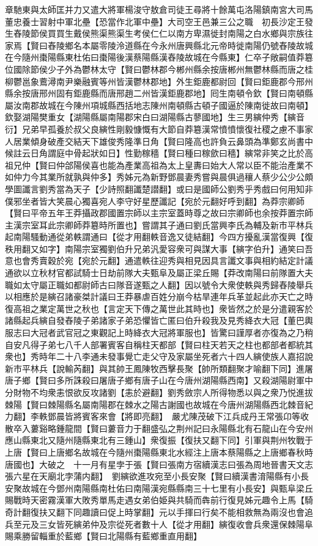 章馳東與太師匡并力又遣大將軍楊浚守敖倉司徒王尋將十餘萬屯洛陽鎮南宮大司馬董忠養士習射中軍北壘【恐當作北軍中壘】大司空王邑兼三公之職　初長沙定王發生舂陵節侯買買生戴侯熊渠熊渠生考侯仁仁以南方卑濕徙封南陽之白水鄉與宗族往家焉【賢曰舂陵鄉名本屬零陵泠道縣在今永州唐興縣北元帝時徙南陽仍號舂陵故城在今隨州棗陽縣東杜佑曰棗陽後漢蔡陽縣漢舂陵故城在今縣東】仁卒子敞嗣值莽簒位國除節侯少子外為鬱林太守【賢曰鬱林郡今郴州縣余按唐郴州無鬱林縣而唐之桂柳鬱邕象鷰潯南尹樂融賓等州皆漢鬱林郡地】外生鉅鹿都尉回【賢曰鉅鹿郡今邢州縣余按唐邢州固有鉅鹿縣而唐邢趙二州皆漢鉅鹿郡地】囘生南頓令欽【賢曰南頓縣屬汝南郡故城在今陳州項城縣西括地志陳州南頓縣古頓子國逼於陳南徙故曰南頓】欽娶湖陽樊重女【湖陽縣屬南陽郡宋白曰湖陽縣古蓼國地】生三男縯仲秀【縯音衍】兄弟早孤養於叔父良縯性剛毅慷慨有大節自莽簒漢常憤憤懷復社稷之慮不事家人居業傾身破產交結天下雄俊秀隆準日角【賢曰隆高也許負云鼻頭為準鄭玄尚書中候註云日角謂庭中骨起狀如日】性勤稼穡【賢曰種曰稼歛曰穡】縯常非笑之比於高祖兄仲【賢曰仲郃陽侯喜也能為產業高祖為太上皇夀曰始大人常以臣不能治產業不如仲力今其業所就孰與仲多】秀姊元為新野鄧晨妻秀嘗與晨俱過穰人蔡少公少公頗學圖讖言劉秀當為天子【少詩照翻讖楚譛翻】或曰是國師公劉秀乎秀戲曰何用知非僕邪坐者皆大笑晨心獨喜宛人李守好星歷讖記【宛於元翻好呼到翻】為莽宗卿師【賢曰平帝五年王莽攝政郡國置宗師以主宗室蓋時尊之故曰宗卿師也余按莽置宗師主漢宗室耳此宗卿師莽簒時所置也】嘗謂其子通曰劉氏當興李氏為輔及新市平林兵起南陽騷動通從弟軼謂通曰【從才用翻軼音逸又徒結翻】今四方擾亂漢當復興【復秩用翻又如字】南陽宗室獨劉伯升兄弟汎愛容衆可與謀大事【縯字伯升】通笑曰吾意也會秀賣穀於宛【宛於元翻】通遣軼往迎秀與相見因具言讖文事與相約結定計議通欲以立秋材官都試騎士日劫前隊大夫甄阜及屬正梁丘賜【莽改南陽曰前隊置大夫職如太守屬正職如都尉師古曰隊音遂甄之人翻】因以號令大衆使軼與秀歸舂陵舉兵以相應於是縯召諸豪桀計議曰王莽暴虐百姓分崩今枯旱連年兵革並起此亦天亡之時復高祖之業定萬世之秋也【言定天下傳之萬世此其時也】衆皆然之於是分遣親客於諸縣起兵縯自發舂陵子弟諸家子弟恐懼皆亡匿曰伯升殺我及見秀絳衣大冠【董巴輿服志曰大冠者武官冠之東觀記上時絳衣大冠將軍服也】皆驚曰謹厚者亦復為之乃稍自安凡得子弟七八千人部署賓客自稱柱天都部【賢曰柱天若天之柱也都部者都統其衆也】秀時年二十八李通未發事覺亡走父守及家屬坐死者六十四人縯使族人嘉招說新市平林兵【說輸芮翻】與其帥王鳳陳牧西擊長聚【帥所類翻聚才喻翻下同】進屠唐子鄉【賢曰多所誅殺曰屠唐子鄉有唐子山在今唐州湖陽縣西南】又殺湖陽尉軍中分財物不均衆恚恨欲反攻諸劉【恚於避翻】劉秀斂宗人所得物悉以與之衆乃悦進拔棘陽【賢曰棘陽縣名屬南陽郡在棘水之陽古謝國也故城在今唐州湖陽縣西北棘音紀力翻】李軼鄧晨皆將賓客來會【將即亮翻】　嚴尤陳茂破下江兵成丹王常張卬等收散卒入蔞谿略鍾龍間【賢曰蔞音力于翻盛弘之荆州記曰永陽縣北有石龍山在今安州應山縣東北又隨州隨縣東北有三鍾山】衆復振【復扶又翻下同】引軍與荆州牧戰于上唐【賢曰上唐鄉名故城在今隨州棗陽縣東北水經注上唐本蔡陽縣之上唐鄉春秋時唐國也】大破之　十一月有星孛于張【賢曰張南方宿續漢志曰張為周地晉書天文志張六星在天廟北孛蒲内翻】　劉縯欲進攻宛至小長安聚【賢曰續漢書淯陽縣有小長安聚故城在今鄧州南陽縣南杜佑曰南陽漢宛縣縣南三十七里有小長安】與甄阜梁丘賜戰時天密霧漢軍大敗秀單馬走遇女弟伯姫與共騎而犇前行復見姊元趣令上馬【騎奇計翻復扶又翻下同趣讀曰促上時掌翻】元以手揮曰行矣不能相救無為兩沒也會追兵至元及三女皆死縯弟仲及宗從死者數十人【從才用翻】縯復收會兵衆還保棘陽阜賜乘勝留輜重於藍鄉【賢曰北陽縣有藍鄉重直用翻】